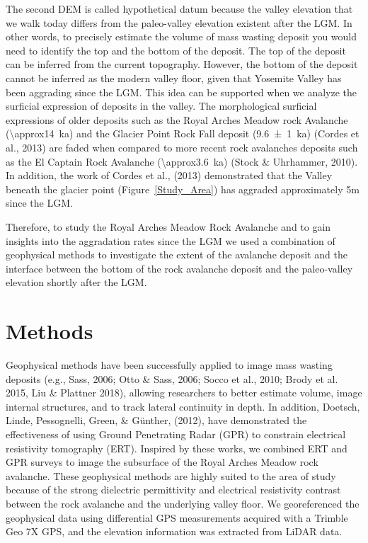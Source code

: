 \documentclass[5p]{elsarticle}
\begin{document}
The second DEM is called hypothetical datum because the valley elevation that we walk today differs from the paleo-valley elevation existent after the LGM. In other words, to precisely estimate the volume of mass wasting deposit you would need to identify the top and the bottom of the deposit. The top of the deposit can be inferred from the current topography. However, the bottom of the deposit cannot be inferred as the modern valley floor, given that Yosemite Valley has been aggrading since the LGM. This idea can be supported when we analyze the surficial expression of deposits in the valley. The morphological surficial expressions of older deposits such as the Royal Arches Meadow rock Avalanche (\SI{\approx14}{\kilo a}) and the Glacier Point Rock Fall deposit (\SI{9.6 \pm 1}{\kilo a}) (Cordes et al., 2013) are faded when compared to more recent rock avalanches deposits such as the El Captain Rock Avalanche (\SI{\approx3.6}{\kilo a}) (Stock \& Uhrhammer, 2010). In addition, the work of Cordes et al., (2013) demonstrated that the Valley beneath the glacier point (Figure~\ref{Study_Area}) has aggraded approximately 5m since the LGM.

Therefore, to study the Royal Arches Meadow Rock Avalanche and to gain insights into the aggradation rates since the LGM we used a combination of geophysical methods to investigate the extent of the avalanche deposit and the interface between the bottom of the rock avalanche deposit and the paleo-valley elevation shortly after the LGM.





\section{Methods}

Geophysical methods have been successfully applied to image mass wasting deposits  (e.g., Sass, 2006; Otto \& Sass, 2006; Socco et al., 2010; Brody et al. 2015, Liu \& Plattner 2018), allowing researchers to better estimate volume, image internal structures, and to track lateral continuity in depth. In addition, Doetsch, Linde, Pessognelli, Green, \& G\"unther, (2012), have demonstrated the effectiveness of using Ground Penetrating Radar (GPR) to constrain electrical resistivity tomography (ERT). Inspired by these works, we combined ERT and GPR surveys to image the subsurface of the Royal Arches Meadow rock avalanche. These geophysical methods are highly suited to the area of study because of the strong dielectric permittivity and electrical resistivity contrast between the rock avalanche and the underlying valley floor. We georeferenced the geophysical data using differential GPS measurements acquired with a Trimble Geo 7X GPS, and the elevation information was extracted from LiDAR data.
\end{document}
